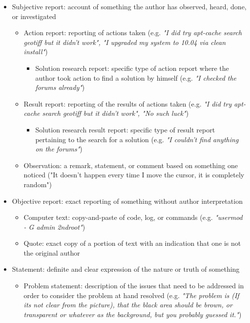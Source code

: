 \documentclass[11pt]{article}
\begin{document}
\begin{itemize}
	\item Subjective report: account of something the author has observed, heard, done, or investigated
		\begin{itemize}
			\item Action report: reporting of actions taken (e.g. \textit{"I did try apt-cache search geotiff but it didn't work", "I upgraded my system to 10.04 via clean install"})
				\begin{itemize}
					\item Solution research report: specific type of action report where the author took action to find a solution by himself (e.g. \textit{"I checked the forums already"})
				\end{itemize}
			\item Result report: reporting of the results of actions taken (e.g. \textit{"I did try apt-cache search geotiff but it didn't work", "No such luck"})
				\begin{itemize}
					\item Solution research result report: specific type of result report pertaining to the search for a solution (e.g. \textit{"I couldn't find anything on the forums"})
				\end{itemize}
			\item Observation: a remark, statement, or comment based on something one noticed ("It doesn't happen every time I move the cursor, it is completely random")
		\end{itemize}
	\item Objective report: exact reporting of something without author interpretation
		\begin{itemize}
			\item Computer text: copy-and-paste of code, log, or commands (e.g. \textit{"usermod - G admin 2ndroot"})
			\item Quote: exact copy of a portion of text with an indication that one is not the original author
		\end{itemize}
	\item Statement: definite and clear expression of the nature or truth of something
		\begin{itemize}
			\item Problem statement: description of the issues that need to be addressed in order to consider the problem at hand resolved (e.g. \textit{"The problem is (If its not clear from the picture), that the black area should be brown, or transparent or whatever as the background, but you probably guessed it."})

\end{itemize}
\end{itemize}
\end{document}
